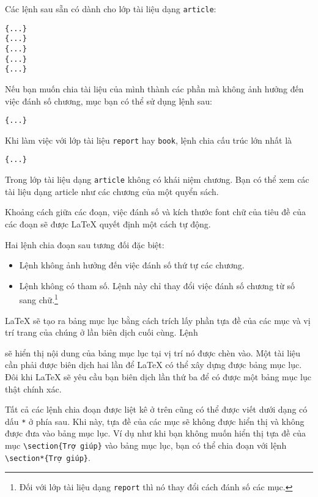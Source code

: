 Các lệnh sau sẵn có dành cho lớp tài liệu dạng \texttt{article}:
\nopagebreak
\begin{lscommand}
\verb|{...}|\\
\verb|{...}|\\
\verb|{...}|\\
\verb|{...}|\\
\verb|{...}|
\end{lscommand}

Nếu bạn muốn chia tài liệu của mình thành các phần mà không ảnh hưởng đến việc đánh số chương, mục bạn có thể sử dụng lệnh sau:
\begin{lscommand}
\verb|{...}|
\end{lscommand}

Khi làm việc với lớp tài liệu \texttt{report} hay \texttt{book}, lệnh chia cấu trúc lớn nhất là
\begin{lscommand}
\verb|{...}|
\end{lscommand}

Trong lớp tài liệu dạng \texttt{article} không có khái niệm chương. Bạn có thể xem các tài liệu dạng article như các chương
của một quyển sách.

Khoảng cách giữa các đoạn, việc đánh số và kích thước font chữ của tiêu đề của các đoạn sẽ được \LaTeX{} quyết định một cách tự động.

Hai lệnh chia đoạn sau tương đối đặc biệt:
\begin{itemize}
\item Lệnh  không ảnh hưởng đến việc đánh số thứ tự các
chương.
\item Lệnh  không có tham số. Lệnh này chỉ
thay đổi việc đánh số chương từ số sang chữ.\footnote{Đối
với lớp tài liệu dạng \texttt{report} thì nó thay đổi cách đánh số
các mục.}
\end{itemize}

\LaTeX{} sẽ tạo ra bảng mục lục bằng cách trích lấy phần tựa đề của các mục và vị trí trang của chúng ở lần  biên dịch cuối cùng. Lệnh
\begin{lscommand}
\end{lscommand}
\noindent sẽ hiển thị nội dung của bảng mục lục tại vị trí nó được chèn vào. Một tài liệu cần phải được biên dịch hai lần để \LaTeX{} có thể xây dựng được bảng mục lục. Đôi khi \LaTeX{} sẽ yêu cầu bạn biên dịch lần thứ ba để có được một bảng mục lục thật chính xác.

Tất cả các lệnh chia đoạn được liệt kê ở trên cũng có thể được viết dưới dạng có dấu \verb|*| ở phía sau. Khi này, tựa đề của các mục sẽ không được hiển thị và không được đưa vào bảng mục lục. Ví dụ như khi bạn không muốn hiển thị tựa đề của mục \verb|\section{Trợ giúp}| vào bảng mục lục, bạn có thể chia đoạn với lệnh \verb|\section*{Trợ giúp}|.

